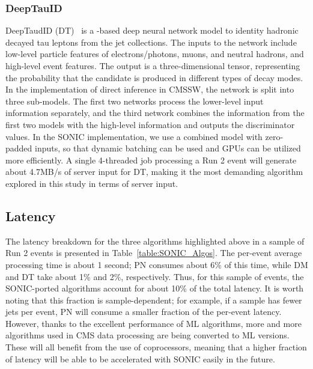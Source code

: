 \subsubsection{DeepTauID}

DeepTaudID (DT)~\cite{CMS:2022prd} is a \TENSORFLOW-based deep neural network model to identity hadronic decayed tau leptons from the jet collections. The inputs to the network include low-level particle features of electrons/photons, muons, and neutral hadrons, and high-level event features. The output is a three-dimensional tensor, representing the probability that the candidate is produced in different types of decay modes. In the implementation of direct inference in CMSSW, the network is split into three sub-models. The first two networks process the lower-level input information separately, and the third network combines the information from the first two models with the high-level information and outputs the discriminator values. In the SONIC implementation, we use a combined model with zero-padded inputs, so that dynamic batching can be used and GPUs can be utilized more efficiently. A single 4-threaded job processing a Run 2 \ttbar event will generate about 4.7\unit{MB/s} of server input for DT, making it the most demanding algorithm explored in this study in terms of server input.
    

\subsection{Latency}

The latency breakdown for the three algorithms highlighted above in a sample of Run 2 \ttbar events is presented in Table~\ref{table:SONIC_Algos}. The per-event average processing time is about 1 second; PN consumes about 6\% of this time, while DM and DT take about 1\% and 2\%, respectively. Thus, for this sample of events, the SONIC-ported algorithms account for about 10\% of the total latency. It is worth noting that this fraction is sample-dependent; for example, if a sample has fewer jets per event, PN will consume a smaller fraction of the per-event latency. However, thanks to the excellent performance of ML algorithms, more and more algorithms used in CMS data processing are being converted to ML versions. These will all benefit from the use of coprocessors, meaning that a higher fraction of latency will be able to be accelerated with SONIC easily in the future.

